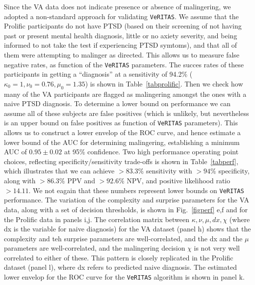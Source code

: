\documentclass[onecolumn,10pt]{IEEEtran}
\def\vrts{\texttt{VeRITAS}\xspace}
\begin{document}
Since the VA data does not indicate  presence or absence of malingering, we adopted a non-standard approach for validating \vrts. We assume that the Prolific participants do not have PTSD (based on their screening of not having past or present mental health diagnosis, little or no axiety severity, and being informed to not take the test if experiencing PTSD symtoms), and that all of them were attempting to malinger as directed. This allows us to  measure false negative rates, as function of the \vrts parameters. The succes rates of these participants in getting a ``diagnosis'' at a sensitivity of 94.2\% ($\kappa_0=1,\nu_0=0.76,\mu_0=1.35$) is shown in Table~\ref{tabprolific}. Then we check how many of the VA participants are flagged as malingering amongst the ones with a naive PTSD diagnosis. To determine a lower bound on performance we can assume all of these subjects are false positives (which is unlikely, but nevertheless is an upper bound on false positives as function of \vrts parameters). This allows us to construct a lower envelop of the ROC curve, and hence estimate a lower bound of the AUC for determining malingering, establishing a minimum AUC of {\color{Red1} $0.95 \pm 0.02$ at 95\% confidence}. Two high performance operating point choices, reflecting specificity/sensitivity trade-offs is shown in Table~\ref{tabperf}, which illustrates that we can achieve $>83.3\%$ sensitivity with $>94\%$ specificity, along with $>86.3\%$ PPV and $>92.6\%$ NPV, and positive likelihood ratio $>14.11$. We not eagain that these numbers represent lower bounds on \vrts performance. The variation of the complexity and surprise parameters for the VA data, along with a set of decision thresholds, is shown in Fig.~\ref{figperf} e,f and for the Prolific data in panels i,j. The correlation matrix between $\kappa, \nu, \mu, dx, \chi$ (where dx is the variable for  naive diagnosis) for the VA dataset (panel h) shows that the complexity and teh surprise parameters are well-correlated, and the dx and the $\mu$ parameters are well-correlated, and the malingering decision $\chi$ is not very well correlated to either of these. This pattern is closely replicated in the Prolific dataset (panel l), where dx refers to predicted naive diagnosis. The estimated lower envelop for the ROC curve for the \vrts algorithm is shown in panel k.

  
\end{document}
